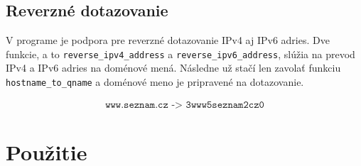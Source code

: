 \section{Reverzné dotazovanie}
V programe je podpora pre reverzné dotazovanie IPv4 aj IPv6 adries. Dve funkcie, a to \texttt{reverse\_ipv4\_address} a \texttt{reverse\_ipv6\_address}, slúžia na prevod IPv4 a IPv6 adries na doménové mená. Následne už stačí len zavolať funkciu \texttt{hostname\_to\_qname} a doménové meno je pripravené na dotazovanie.




\begin{gather*}
    \texttt{www.seznam.cz -> 3www5seznam2cz0}
\end{gather*}



\chapter{Použitie}
